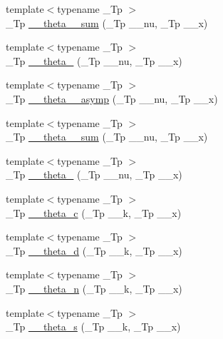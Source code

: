 \begin{DoxyCompactItemize}
\item 
{\footnotesize template$<$typename \+\_\+\+Tp $>$ }\\\+\_\+\+Tp \hyperlink{namespacestd_1_1____detail_af434f6a07d92577f40f352aa3d44483c}{\+\_\+\+\_\+theta\+\_\+\_\+sum} (\+\_\+\+Tp \+\_\+\+\_\+nu, \+\_\+\+Tp \+\_\+\+\_\+x)
\item 
{\footnotesize template$<$typename \+\_\+\+Tp $>$ }\\\+\_\+\+Tp \hyperlink{namespacestd_1_1____detail_a6f965c639307555e5979b954a11ca0b8}{\+\_\+\+\_\+theta\+\_} (\+\_\+\+Tp \+\_\+\+\_\+nu, \+\_\+\+Tp \+\_\+\+\_\+x)
\item 
{\footnotesize template$<$typename \+\_\+\+Tp $>$ }\\\+\_\+\+Tp \hyperlink{namespacestd_1_1____detail_a975a9a52a8a483849dd0877c24ca5d74}{\+\_\+\+\_\+theta\+\_\+\_\+asymp} (\+\_\+\+Tp \+\_\+\+\_\+nu, \+\_\+\+Tp \+\_\+\+\_\+x)
\item 
{\footnotesize template$<$typename \+\_\+\+Tp $>$ }\\\+\_\+\+Tp \hyperlink{namespacestd_1_1____detail_a3dc1b5188464b81b6acbb2983ef0f77c}{\+\_\+\+\_\+theta\+\_\+\_\+sum} (\+\_\+\+Tp \+\_\+\+\_\+nu, \+\_\+\+Tp \+\_\+\+\_\+x)
\item 
{\footnotesize template$<$typename \+\_\+\+Tp $>$ }\\\+\_\+\+Tp \hyperlink{namespacestd_1_1____detail_a274d3801b84bcaad13c274c8bab32bcc}{\+\_\+\+\_\+theta\+\_} (\+\_\+\+Tp \+\_\+\+\_\+nu, \+\_\+\+Tp \+\_\+\+\_\+x)
\item 
{\footnotesize template$<$typename \+\_\+\+Tp $>$ }\\\+\_\+\+Tp \hyperlink{namespacestd_1_1____detail_af95cdf16bfcf6c138d621b0c518a3299}{\+\_\+\+\_\+theta\+\_\+c} (\+\_\+\+Tp \+\_\+\+\_\+k, \+\_\+\+Tp \+\_\+\+\_\+x)
\item 
{\footnotesize template$<$typename \+\_\+\+Tp $>$ }\\\+\_\+\+Tp \hyperlink{namespacestd_1_1____detail_ad4ca29063a2f624e185592497d37a670}{\+\_\+\+\_\+theta\+\_\+d} (\+\_\+\+Tp \+\_\+\+\_\+k, \+\_\+\+Tp \+\_\+\+\_\+x)
\item 
{\footnotesize template$<$typename \+\_\+\+Tp $>$ }\\\+\_\+\+Tp \hyperlink{namespacestd_1_1____detail_aace76210c8f70761bb14ab602b88d027}{\+\_\+\+\_\+theta\+\_\+n} (\+\_\+\+Tp \+\_\+\+\_\+k, \+\_\+\+Tp \+\_\+\+\_\+x)
\item 
{\footnotesize template$<$typename \+\_\+\+Tp $>$ }\\\+\_\+\+Tp \hyperlink{namespacestd_1_1____detail_aeac5da2d394fafe6432871abf5c05413}{\+\_\+\+\_\+theta\+\_\+s} (\+\_\+\+Tp \+\_\+\+\_\+k, \+\_\+\+Tp \+\_\+\+\_\+x)

\end{DoxyCompactItemize}
